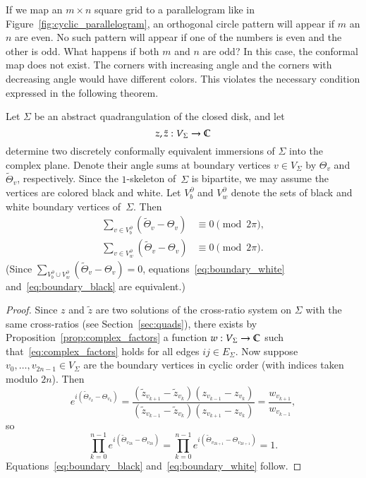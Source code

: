 \documentclass[Thesis]{subfiles}
\begin{document}
If we map an $m\times n$ square grid to a parallelogram like in
Figure~\ref{fig:cyclic_parallelogram}, an orthogonal circle pattern
will appear if $m$ an $n$ are even. No such pattern will appear if one
of the numbers is even and the other is odd. What happens if both $m$
and $n$ are odd? In this case, the conformal map does not exist. The
corners with increasing angle and the corners with decreasing angle
would have different colors. This violates the necessary condition
expressed in the following theorem.

\begin{theorem}
  Let $\Sigma$ be an abstract quadrangulation of the closed disk, and
  let 
  \begin{equation*}
    z,\tilde z: V_{\Sigma}\rightarrow\mathbb C
  \end{equation*}
  determine two discretely conformally equivalent immersions of\/
  $\Sigma$ into the complex plane. Denote their angle sums at boundary
  vertices $v\in V_{\Sigma}$ by\/ $\Theta_{v}$ and\/
  $\tilde\Theta_{v}$, respectively. Since the $1$-skeleton of\/~$\Sigma$ is
  bipartite, we may assume the vertices are colored black and
  white. Let $V^{\partial}_{b}$ and $V^{\partial}_{w}$ denote the sets
  of black and white boundary vertices of\/~$\Sigma$. Then
  \begin{align}
    \label{eq:boundary_black}
    \sum_{v\in V^{\partial}_b}(\tilde\Theta_v - \Theta_v)
    &\equiv 0 \pmod{2\pi},\\
    \label{eq:boundary_white}
    \sum_{v\in V^{\partial}_w}(\tilde\Theta_v - \Theta_v)
    &\equiv 0 \pmod{2\pi}.
  \end{align}
  (Since $\sum_{V^{\partial}_b \cup
    V^{\partial}_w}(\tilde\Theta_{v}-\Theta_{v})=0$,
  equations~\eqref{eq:boundary_white} and~\eqref{eq:boundary_black}
  are equivalent.)
\end{theorem}

\begin{proof}
  Since $z$ and $\tilde z$ are two solutions of the cross-ratio system
  on $\Sigma$ with the same cross-ratios (see
  Section~\ref{sec:quads}), there exists by
  Proposition~\ref{prop:complex_factors} a function
  $w:V_{\Sigma}\rightarrow\mathbb C$ such that~\eqref{eq:complex_factors}
  holds for all edges $\mathit{ij}\in E_{\Sigma}$. Now suppose
  $v_{0},\ldots,v_{2n-1}\in V_{\Sigma}$ are the boundary vertices in
  cyclic order (with indices taken modulo $2n$). Then
  \begin{equation*}
    e^{i(\tilde\Theta_{v_{k}} - \Theta_{v_{k}})}=
    \frac{(\tilde z_{v_{k+1}}-\tilde z_{v_{k}})(z_{v_{k-1}}-z_{v_{k}})}%
    {(\tilde z_{v_{k-1}}-\tilde z_{v_{k}})(z_{v_{k+1}}-z_{v_{k}})}
    =\frac{w_{v_{k+1}}}{w_{v_{k-1}}},
  \end{equation*}
  so
  \begin{equation*}
    \prod_{k=0}^{n-1}e^{i(\tilde\Theta_{v_{2k}} - \Theta_{v_{2k}})}=
    \prod_{k=0}^{n-1}e^{i(\tilde\Theta_{v_{2k+1}} -
      \Theta_{v_{2k+1}})}=
    1.
  \end{equation*}
  Equations~\eqref{eq:boundary_black} and~\eqref{eq:boundary_white}
  follow.
\end{proof}
\end{document}
